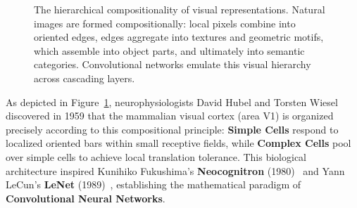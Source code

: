 \begin{figure}[H]
\centering
{}
\caption{The hierarchical compositionality of visual representations. Natural images are formed compositionally: local pixels combine into oriented edges, edges aggregate into textures and geometric motifs, which assemble into object parts, and ultimately into semantic categories. Convolutional networks emulate this visual hierarchy across cascading layers.}
\label{fig:visual_feature_hierarchy}
\end{figure}

As depicted in Figure~\ref{fig:visual_feature_hierarchy}, neurophysiologists David Hubel and Torsten Wiesel~\cite{hubel1959receptive,hubel1962receptive} discovered in 1959 that the mammalian visual cortex (area V1) is organized precisely according to this compositional principle: \textbf{Simple Cells} respond to localized oriented bars within small receptive fields, while \textbf{Complex Cells} pool over simple cells to achieve local translation tolerance. 
This biological architecture inspired Kunihiko Fukushima's \textbf{Neocognitron} (1980)~\cite{fukushima1980neocognitron} and Yann LeCun's \textbf{LeNet} (1989)~\cite{lecun1989backpropagation}, establishing the mathematical paradigm of \textbf{Convolutional Neural Networks}.

